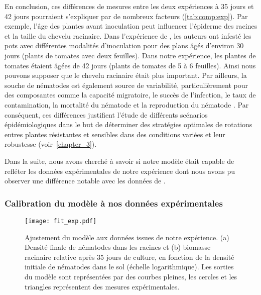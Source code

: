 	
	En conclusion, ces différences de mesures entre les deux expériences à 35 jours et 42 jours pourraient s'expliquer par de nombreux facteurs  (\autoref{tab:comp:exp}). Par exemple,  l'âge des plantes avant inoculation peut influencer l'épiderme des racines et la taille du chevelu racinaire. Dans l'expérience de \citet{Ehwaeti1998}, les auteurs ont infesté les pots avec différentes modalités d'inoculation pour des plans âgés d'environ 30 jours (plants de tomates avec deux  feuilles). Dans notre expérience, les plantes de tomates étaient âgées de 42 jours (plants de tomates de 5 à 6 feuilles). Ainsi nous pouvons supposer que le chevelu racinaire était plus important.
Par ailleurs, la souche de nématodes est  également source de variabilité, particulièrement  pour des composantes comme la capacité migratoire, le succès de l'infection, le taux de contamination, la mortalité du nématode et  la reproduction du nématode \citep{Pegard2005, Castagnone-Sereno2007, Djian-Caporalino2011}.
Par conséquent, ces différences justifient l'étude de différents scénarios épidémiologiques  dans le but de déterminer des stratégies optimales de rotations entres plantes résistantes et sensibles dans des conditions variées et leur robustesse (voir~\autoref{chapter_3}).  
	
	
	Dans la suite, nous avons cherché à savoir si notre modèle était capable de refléter les données expérimentales de notre expérience dont nous avons pu observer une  différence notable avec les données de \citet{Ehwaeti1998}. 
	 
\subsubsection{Calibration du modèle à nos données expérimentales}   \label{sec:calibration}

	 \begin{figure}[H]
			\centering
				\texttt{[image: fit\_exp.pdf]}
				\caption[Ajustement du modèle aux données issues de notre expérience]{Ajustement du modèle aux données 
				issues de notre expérience. (a) Densité finale de nématodes dans les racines et (b)  biomasse racinaire 
				relative après 35 jours de culture, en fonction de la densité initiale de nématodes dans le sol 
				(échelle logarithmique). Les sorties du modèle sont représentées par des courbes pleines, les cercles 
				et les triangles représentent des mesures expérimentales.}
			    \label{fit:expe} 
		\end{figure}
		
